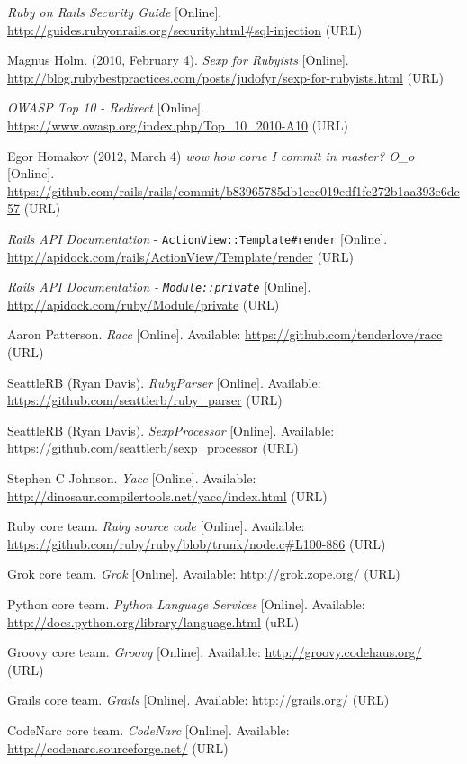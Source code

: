 \documentclass[conference]{IEEEtran}
\begin{document}
\begin{thebibliography}{1}
    \emph{Ruby on Rails Security Guide} [Online]. \url{http://guides.rubyonrails.org/security.html\#sql-injection} (URL)

    Magnus Holm. (2010, February 4). \emph{Sexp for Rubyists} [Online]. \url{http://blog.rubybestpractices.com/posts/judofyr/sexp-for-rubyists.html} (URL)

    \emph{OWASP Top 10 - Redirect} [Online]. \url{https://www.owasp.org/index.php/Top_10_2010-A10} (URL)

    Egor Homakov (2012, March 4) \emph{wow how come I commit in master? O\_o} [Online]. \url{https://github.com/rails/rails/commit/b83965785db1eec019edf1fc272b1aa393e6dc57} (URL)

    \emph{Rails API Documentation} - \texttt{ActionView::Template\#render} [Online]. \url{http://apidock.com/rails/ActionView/Template/render} (URL)

    \emph{Rails API Documentation - \texttt{Module::private}} [Online]. \url{http://apidock.com/ruby/Module/private} (URL)

    Aaron Patterson. \emph{Racc} [Online].  Available: \url{https://github.com/tenderlove/racc} (URL)

    SeattleRB (Ryan Davis). \emph{RubyParser} [Online].  Available: \url{https://github.com/seattlerb/ruby_parser} (URL)

    SeattleRB (Ryan Davis). \emph{SexpProcessor} [Online].  Available: \url{https://github.com/seattlerb/sexp_processor} (URL)

    Stephen C Johnson. \emph{Yacc} [Online].  Available: \url{http://dinosaur.compilertools.net/yacc/index.html} (URL)

    Ruby core team. \emph{Ruby source code} [Online].  Available: \url{https://github.com/ruby/ruby/blob/trunk/node.c\#L100-886} (URL)

    Grok core team. \emph{Grok} [Online].  Available: \url{http://grok.zope.org/} (URL)

    Python core team.  \emph{Python Language Services} [Online].  Available: \url{http://docs.python.org/library/language.html} (uRL)

    Groovy core team. \emph{Groovy} [Online].  Available: \url{http://groovy.codehaus.org/} (URL)

    Grails core team. \emph{Grails} [Online].  Available: \url{http://grails.org/} (URL)

    CodeNarc core team.  \emph{CodeNarc} [Online].  Available: \url{http://codenarc.sourceforge.net/} (URL)

\end{thebibliography}
\end{document}

